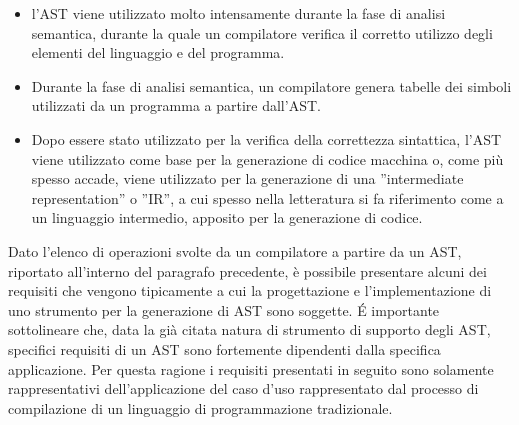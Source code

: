 \begin{itemize}

\item l'AST viene utilizzato molto intensamente durante la fase di analisi
semantica, durante la quale un compilatore verifica il corretto utilizzo degli
elementi del linguaggio e del programma.

\item Durante la fase di analisi semantica, un compilatore genera tabelle dei
simboli utilizzati da un programma a partire dall’AST.

\item Dopo essere stato utilizzato per la verifica della correttezza sintattica,
l’AST viene utilizzato come base per la generazione di codice macchina o, come
più spesso accade, viene utilizzato per la generazione di una ”intermediate
representation” o ”IR”, a cui spesso nella letteratura si fa riferimento come a
un linguaggio intermedio, apposito per la generazione di codice.

\end{itemize}

Dato l’elenco di operazioni svolte da un compilatore a partire da un AST,
riportato all’interno del paragrafo precedente, è possibile presentare alcuni
dei requisiti che vengono tipicamente a cui la progettazione e l’implementazione
di uno strumento per la generazione di AST sono soggette. É importante
sottolineare che, data la già citata natura di strumento di supporto degli AST,
specifici requisiti di un AST sono fortemente dipendenti dalla specifica
applicazione. Per questa ragione i requisiti presentati in seguito sono
solamente rappresentativi dell’applicazione del caso d'uso rappresentato dal
processo di compilazione di un linguaggio di programmazione tradizionale.

